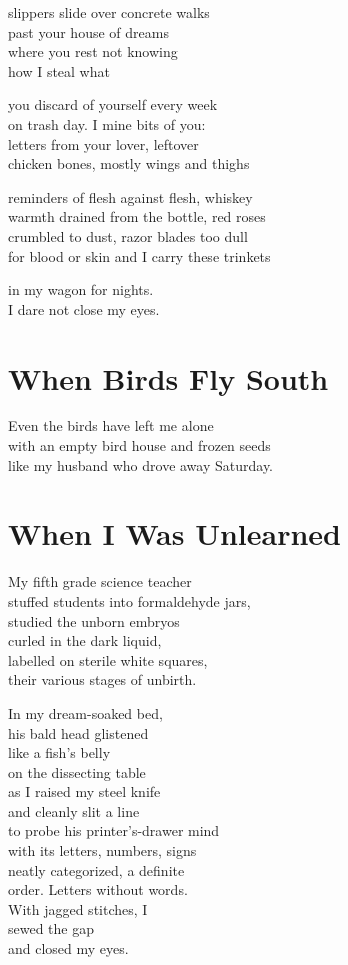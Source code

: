 \documentclass[twoside,10pt]{book}
\begin{document}
slippers slide over concrete walks\\
past your house of dreams\\
where you rest not knowing\\
how I steal what

you discard of yourself every week\\
on trash day. I mine bits of you:\\
letters from your lover, leftover\\
chicken bones, mostly wings and thighs

reminders of flesh against flesh, whiskey\\
warmth drained from the bottle, red roses\\
crumbled to dust, razor blades too dull\\
for blood or skin and I carry these trinkets

in my wagon for nights.\\
I dare not close my eyes.


\clearpage
\section{When Birds Fly South}

Even the birds have left me alone\\
with an empty bird house and frozen seeds\\
like my husband who drove away Saturday.


\clearpage
\section{When I Was Unlearned}

My fifth grade science teacher\\
stuffed students into formaldehyde jars,\\
studied the unborn embryos\\
curled in the dark liquid,\\
labelled on sterile white squares,\\
their various stages of unbirth.

In my dream-soaked bed,\\
his bald head glistened\\
like a fish's belly\\
on the dissecting table\\
as I raised my steel knife\\
and cleanly slit a line\\
to probe his printer's-drawer mind\\
with its letters, numbers, signs\\
neatly categorized, a definite\\
order. Letters without words.\\
With jagged stitches, I\\
sewed the gap\\
and closed my eyes.
\end{document}
